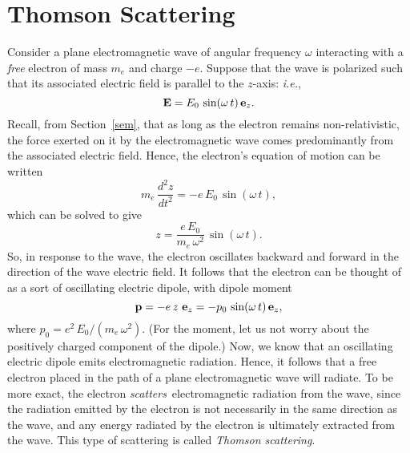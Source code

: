\section{Thomson Scattering}
Consider a plane electromagnetic wave of angular frequency $\omega$
interacting with a {\em free}\/ electron of mass $m_e$ and charge $-e$. Suppose that
the wave is polarized such that its associated electric field is parallel
to the $z$-axis: {\em i.e.},
\begin{equation}\label{e9.46}
{\bf E} = E_0\,\sin(\omega\,t)\,{\bf e}_z.
\end{equation}
Recall, from Section~\ref{sem}, that as long as the electron remains non-relativistic, the force exerted on it by the electromagnetic wave comes
predominantly from the associated electric field. Hence, the electron's equation of
motion can be written
\begin{equation}
m_e\,\frac{d^2 z}{dt^2} = -e\,E_0\,\sin(\omega\,t),
\end{equation}
which can be solved to give
\begin{equation}
z = \frac{e\,E_0}{m_e\,\omega^2}\,\sin(\omega\,t).
\end{equation}
So, in response to the wave, the electron oscillates backward and forward in the direction of the
wave electric field. It follows that the electron can be thought of as a sort of
oscillating electric dipole, with dipole moment
\begin{equation}
{\bf p} = - e\,z\,\,{\bf e}_z = -p_0\,\sin(\omega\,t)\,{\bf e}_z,
\end{equation}
where $p_0 = e^2\,E_0/(m_e\, \omega^2)$.  (For the moment, let us not worry  about the
positively charged component of the dipole.) Now, we know that an
oscillating electric dipole emits electromagnetic radiation. Hence, it
follows that a free electron placed in the path of a plane
electromagnetic wave will radiate. To be more exact, the electron
{\em scatters}\, electromagnetic radiation from the wave, since the
radiation emitted by the electron is not necessarily in the same direction
as the wave, and any energy radiated by the electron is ultimately extracted
from the wave. This type of scattering is called {\em Thomson scattering}.

